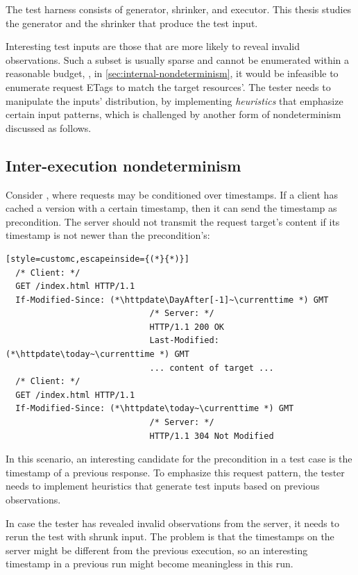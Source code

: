 The test harness consists of generator, shrinker, and executor.  This thesis
studies the generator and the shrinker that produce the test input.

Interesting test inputs are those that are more likely to reveal invalid
observations.  Such a subset is usually sparse and cannot be enumerated within a
reasonable budget, \eg, in \autoref{sec:internal-nondeterminism}, it would be
infeasible to enumerate request ETags to match the target resources'.  The
tester needs to manipulate the inputs' distribution, by implementing {\em
heuristics} that emphasize certain input patterns, which is challenged by
another form of nondeterminism discussed as follows.

\subsection{Inter-execution nondeterminism}
\label{sec:inter-execution}
Consider \http, where requests may be conditioned over timestamps.  If a client
has cached a version with a certain timestamp, then it can send the timestamp as
 precondition.  The server should not transmit the
request target's content if its  timestamp is not newer
than the precondition's:
\begin{lstlisting}[style=customc,escapeinside={(*}{*)}]
  /* Client: */
  GET /index.html HTTP/1.1
  If-Modified-Since: (*\httpdate\DayAfter[-1]~\currenttime *) GMT
                             /* Server: */
                             HTTP/1.1 200 OK
                             Last-Modified: (*\httpdate\today~\currenttime *) GMT
                             ... content of target ...
  /* Client: */
  GET /index.html HTTP/1.1
  If-Modified-Since: (*\httpdate\today~\currenttime *) GMT
                             /* Server: */
                             HTTP/1.1 304 Not Modified
\end{lstlisting}
In this scenario, an interesting candidate for the 
precondition in a test case is the  timestamp of a
previous response.  To emphasize this request pattern, the tester needs to
implement heuristics that generate test inputs based on previous observations.

In case the tester has revealed invalid observations from the server, it needs
to rerun the test with shrunk input.  The problem is that the timestamps on the
server might be different from the previous execution, so an interesting
timestamp in a previous run might become meaningless in this run.

